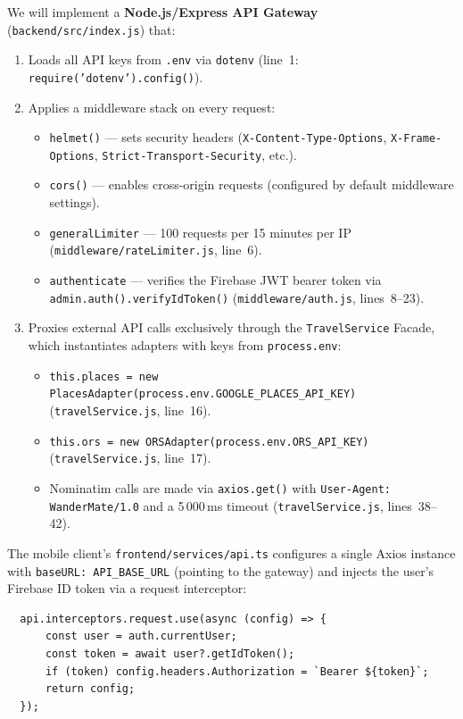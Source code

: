 \documentclass[12pt, a4paper]{article}
\newcommand{\code}[1]{\texttt{\small #1}}
\begin{document}
\begin{tcolorbox}[adrbox]
We will implement a \textbf{Node.js/Express API Gateway} (\code{backend/src/index.js}) that:
\begin{enumerate}
  \item Loads all API keys from \code{.env} via \code{dotenv} (line~1: \code{require('dotenv').config()}).
  \item Applies a middleware stack on every request:
    \begin{itemize}
      \item \code{helmet()} --- sets security headers (\code{X-Content-Type-Options}, \code{X-Frame-Options}, \code{Strict-Transport-Security}, etc.).
      \item \code{cors()} --- enables cross-origin requests (configured by default middleware settings).
      \item \code{generalLimiter} --- 100 requests per 15 minutes per IP (\code{middleware/rateLimiter.js}, line~6).
      \item \code{authenticate} --- verifies the Firebase JWT bearer token via \code{admin.auth().verifyIdToken()} (\code{middleware/auth.js}, lines~8--23).
    \end{itemize}
  \item Proxies external API calls exclusively through the \code{TravelService} Facade, which instantiates adapters with keys from \code{process.env}:
    \begin{itemize}
      \item \code{this.places = new PlacesAdapter(process.env.GOOGLE\_PLACES\_API\_KEY)} (\code{travelService.js}, line~16).
      \item \code{this.ors = new ORSAdapter(process.env.ORS\_API\_KEY)} (\code{travelService.js}, line~17).
      \item Nominatim calls are made via \code{axios.get()} with \code{User-Agent: WanderMate/1.0} and a 5\,000\,ms timeout (\code{travelService.js}, lines~38--42).
    \end{itemize}
\end{enumerate}

The mobile client's \code{frontend/services/api.ts} configures a single Axios instance with \code{baseURL: API\_BASE\_URL} (pointing to the gateway) and injects the user's Firebase ID token via a request interceptor:

\begin{verbatim}
  api.interceptors.request.use(async (config) => {
      const user = auth.currentUser;
      const token = await user?.getIdToken();
      if (token) config.headers.Authorization = `Bearer ${token}`;
      return config;
  });
\end{verbatim}


\end{tcolorbox}
\end{document}
